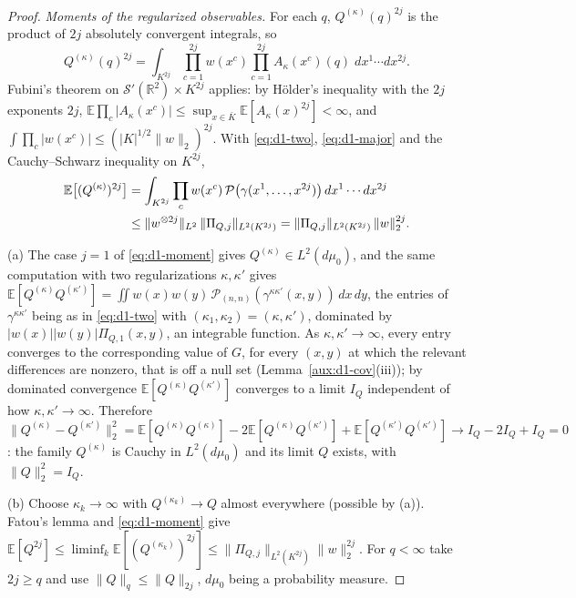 \documentclass[11pt,a4paper]{article}
\theoremstyle{plain}
\theoremstyle{definition}
\theoremstyle{plain}
\theoremstyle{definition}
\newcommand{\R}{\mathbb{R}}
\newcommand{\E}{\mathbb{E}}
\newcommand{\dmu}{d\mu_0}
\begin{document}
\begin{proof}
\emph{Moments of the regularized observables.} For each $q$, $Q^{(\kappa)}(q)^{2j}$ is the
product of $2j$ absolutely convergent integrals, so
\[
 Q^{(\kappa)}(q)^{2j}=\int_{K^{2j}}\prod_{c=1}^{2j}w(x^c)\prod_{c=1}^{2j}A_\kappa(x^c)(q)\;
 dx^1\cdots dx^{2j} .
\]
Fubini's theorem on $\mathcal S'(\R^2)\times K^{2j}$ applies: by H\"older's inequality with the
$2j$ exponents $2j$, $\E\prod_c|A_\kappa(x^c)|\le\sup_{x\in\bar K}\E[A_\kappa(x)^{2j}]<\infty$,
and $\int\prod_c|w(x^c)|\le(|K|^{1/2}\|w\|_2)^{2j}$. With \eqref{eq:d1-two},
\eqref{eq:d1-major} and the Cauchy--Schwarz inequality on $K^{2j}$,
\begin{align}
 \E\bigl[(Q^{(\kappa)})^{2j}\bigr]
 &=\int_{K^{2j}}\prod_cw(x^c)\,\mathcal P\bigl(\gamma(x^1,\dots,x^{2j})\bigr)\,
   dx^1\cdots dx^{2j}\notag\\
 &\le\|w^{\otimes2j}\|_{L^2}\,\|\Pi_{Q,j}\|_{L^2(K^{2j})}
 =\|\Pi_{Q,j}\|_{L^2(K^{2j})}\,\|w\|_2^{2j} .\label{eq:d1-moment}
\end{align}

(a) The case $j=1$ of \eqref{eq:d1-moment} gives $Q^{(\kappa)}\in L^2(\dmu)$, and the same
computation with two regularizations $\kappa,\kappa'$ gives
$\E[Q^{(\kappa)}Q^{(\kappa')}]=\iint w(x)w(y)\,\mathcal P_{(n,n)}(\gamma^{\kappa\kappa'}(x,y))\,dx\,dy$,
the entries of $\gamma^{\kappa\kappa'}$ being as in \eqref{eq:d1-two} with
$(\kappa_1,\kappa_2)=(\kappa,\kappa')$, dominated by $|w(x)||w(y)|\Pi_{Q,1}(x,y)$, an
integrable function. As $\kappa,\kappa'\to\infty$, every entry converges to the corresponding
value of $G$, for every $(x,y)$ at which the relevant differences are nonzero, that is off a
null set (Lemma~\ref{aux:d1-cov}(iii)); by dominated convergence
$\E[Q^{(\kappa)}Q^{(\kappa')}]$ converges to a limit $I_Q$ independent of how
$\kappa,\kappa'\to\infty$. Therefore
$\|Q^{(\kappa)}-Q^{(\kappa')}\|_2^2=\E[Q^{(\kappa)}Q^{(\kappa)}]-2\E[Q^{(\kappa)}Q^{(\kappa')}]
+\E[Q^{(\kappa')}Q^{(\kappa')}]\to I_Q-2I_Q+I_Q=0$: the family $Q^{(\kappa)}$ is Cauchy in
$L^2(\dmu)$ and its limit $Q$ exists, with $\|Q\|_2^2=I_Q$.

(b) Choose $\kappa_k\to\infty$ with $Q^{(\kappa_k)}\to Q$ almost everywhere (possible by (a)).
Fatou's lemma and \eqref{eq:d1-moment} give
$\E[Q^{2j}]\le\liminf_k\E[(Q^{(\kappa_k)})^{2j}]\le\|\Pi_{Q,j}\|_{L^2(K^{2j})}\|w\|_2^{2j}$.
For $q<\infty$ take $2j\ge q$ and use $\|Q\|_q\le\|Q\|_{2j}$, $\dmu$ being a probability
measure.


\end{proof}
\end{document}
